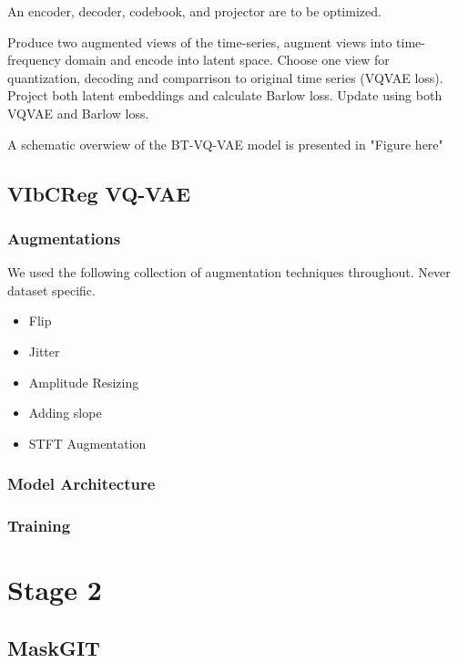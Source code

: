 \documentclass[../../thesis.tex]{subfiles}
\begin{document}
An encoder, decoder, codebook, and projector are to be optimized.

Produce two augmented views of the time-series, augment views into time-frequency domain and encode into latent space. Choose one view for quantization, decoding and comparrison to original time series (VQVAE loss). Project both latent embeddings and calculate Barlow loss. Update using both VQVAE and Barlow loss.

A schematic overwiew of the BT-VQ-VAE model is presented in "Figure here"

\subsection{VIbCReg VQ-VAE}

\subsubsection{Augmentations}
We used the following collection of augmentation techniques throughout. Never dataset specific.
\begin{itemize}
    \item Flip
    \item Jitter
    \item Amplitude Resizing
    \item Adding slope
    \item STFT Augmentation
\end{itemize}

\subsubsection{Model Architecture}

\subsubsection{Training}

\section{Stage 2}

\subsection{MaskGIT}
\end{document}
